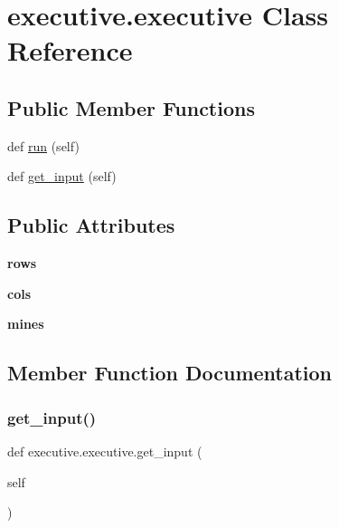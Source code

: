 \hypertarget{classexecutive_1_1executive}{}\section{executive.\+executive Class Reference}
\label{classexecutive_1_1executive}
\subsection*{Public Member Functions}
\begin{DoxyCompactItemize}
\item 
def \mbox{\hyperlink{classexecutive_1_1executive_abe92cddf119081cac6c747858df061d7}{run}} (self)
\item 
def \mbox{\hyperlink{classexecutive_1_1executive_ab6868bdd71365b918ef8199872be6035}{get\+\_\+input}} (self)
\end{DoxyCompactItemize}
\subsection*{Public Attributes}
\begin{DoxyCompactItemize}
\item 
\mbox{\label{classexecutive_1_1executive_a95dd450a8db78fa55cf0920475504983}} 
{\bfseries rows}
\item 
\mbox{\label{classexecutive_1_1executive_a1b724fd808346e0f9258111ac99ff9a7}} 
{\bfseries cols}
\item 
\mbox{\label{classexecutive_1_1executive_a8fd918ea3280772121e6039acdb5ef8e}} 
{\bfseries mines}
\end{DoxyCompactItemize}


\subsection{Member Function Documentation}
\mbox{\label{classexecutive_1_1executive_ab6868bdd71365b918ef8199872be6035}} 
\subsubsection{\texorpdfstring{get\+\_\+input()}{get\_input()}}
{\footnotesize\ttfamily def executive.\+executive.\+get\+\_\+input (\begin{DoxyParamCaption}\item[{}]{self }\end{DoxyParamCaption})}

